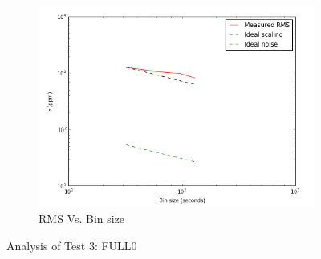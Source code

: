 \documentclass[conference]{IEEEtran}
\begin{document}
\begin{figure}[H]
    \begin{subfigure}{3}
        \includegraphics[scale=0.6]{rms_test3}
        \caption{RMS Vs. Bin size}
    \end{subfigure}
    \caption{Analysis of Test 3: FULL0}
\end{figure}
\end{document}
